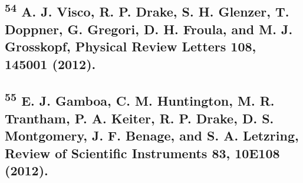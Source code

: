 \subsection{\texorpdfstring{\textsuperscript{54} A. J. Visco, R. P.
Drake, S. H. Glenzer, T. Doppner, G. Gregori, D. H. Froula, and M. J.
Grosskopf, Physical Review Letters 108, 145001
(2012).}{54 A. J. Visco, R. P. Drake, S. H. Glenzer, T. Doppner, G. Gregori, D. H. Froula, and M. J. Grosskopf, Physical Review Letters 108, 145001 (2012).}}\label{a.-j.-visco-r.-p.-drake-s.-h.-glenzer-t.-doppner-g.-gregori-d.-h.-froula-and-m.-j.-grosskopf-physical-review-letters-108-145001-2012.}

\subsection{\texorpdfstring{\textsuperscript{55} E. J. Gamboa, C. M.
Huntington, M. R. Trantham, P. A. Keiter, R. P. Drake, D. S. Montgomery,
J. F. Benage, and S. A. Letzring, Review of Scientific Instruments 83,
10E108
(2012).}{55 E. J. Gamboa, C. M. Huntington, M. R. Trantham, P. A. Keiter, R. P. Drake, D. S. Montgomery, J. F. Benage, and S. A. Letzring, Review of Scientific Instruments 83, 10E108 (2012).}}\label{e.-j.-gamboa-c.-m.-huntington-m.-r.-trantham-p.-a.-keiter-r.-p.-drake-d.-s.-montgomery-j.-f.-benage-and-s.-a.-letzring-review-of-scientific-instruments-83-10e108-2012.}



